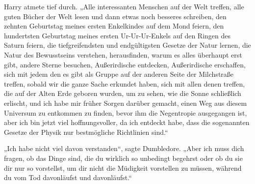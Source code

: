 Harry atmete tief durch.
„Alle interessanten Menschen auf der Welt treffen, alle guten Bücher der Welt lesen und dann etwas noch besseres schreiben, den zehnten Geburtstag meines ersten Enkelkindes auf dem Mond feiern, den hundertsten Geburtstag meines ersten Ur-Ur-Ur-Enkels auf den Ringen des Saturn feiern, die tiefgreifendsten und endgültigsten Gesetze der Natur lernen, die Natur des Bewusstseins verstehen, herausfinden, warum es alles überhaupt erst gibt, andere Sterne besuchen, Außerirdische entdecken, Außerirdische erschaffen, sich mit jedem den es gibt als Gruppe auf der anderen Seite der Milchstraße treffen, sobald wir die ganze Sache erkundet haben, sich mit allen denen treffen, die auf der Alten Erde geboren wurden, um zu sehen, wie die Sonne schließlich erlischt, und ich habe mir früher Sorgen darüber gemacht, einen Weg aus diesem Universum zu entkommen zu finden, bevor ihm die Negentropie ausgegangen ist, aber ich bin jetzt viel hoffnungsvoller, da ich entdeckt habe, dass die sogenannten Gesetze der Physik nur bestmögliche Richtlinien sind.“%

„Ich habe nicht viel davon verstanden“, sagte Dumbledore.
„Aber ich muss dich fragen, ob das Dinge sind, die du wirklich so unbedingt begehrst oder ob du sie dir nur so vorstellst, um dir nicht die Müdigkeit vorstellen zu müssen, während du vom Tod davonläufst und davonläufst.“

